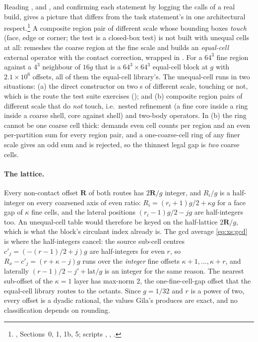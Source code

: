 Reading ,  and
, and confirming each statement by logging the calls of a
real  build, gives a picture that differs from the task statement's in
one architectural respect.\footnote{, Sections~0, 1, 1b, 5;
scripts , , .} A composite
region pair of different scale whose bounding boxes \emph{touch} (face, edge or corner; the
test is a closed-box test) is not built with unequal cells at all:  remeshes
the coarse region at the fine scale and builds an \emph{equal-cell} external operator with
the contact correction, wrapped in . For a $64^3$ fine region against a
$4^3$ neighbour of $16g$ that is a $64^3\times64^3$ equal-cell block at $g$ with
$2.1\times10^{6}$ offsets, all of them the equal-cell library's. The unequal-cell
 runs in two situations: (a) the direct constructor
 on two s of different scale, touching or not, which
is the route the test suite exercises (); and (b) composite region
pairs of different scale that do \emph{not} touch, i.e.\ nested refinement (a fine core
inside a ring inside a coarse shell, core against shell) and two-body operators. In (b) the
ring cannot be one coarse cell thick:  demands even cell counts per region
and  an even per-partition sum for every region pair, and a
one-coarse-cell ring of any finer scale gives an odd sum and is rejected, so the thinnest
legal gap is \emph{two} coarse cells.

\paragraph{The lattice.} Every non-contact offset $\mathbf{R}$ of both routes has
$2\mathbf{R}/g$ integer, and $R_i/g$ is a half-integer on every coarsened axis of even
ratio: $R_i = (r_i+1)g/2+\kappa g$ for a face gap of $\kappa$ fine cells, and the lateral
positions $(r_i-1)g/2 - jg$ are half-integers too. An unequal-cell table would therefore be
keyed on the half-lattice $2\mathbf{R}/g$, which is what the block's circulant index already
is. The gcd average \eqref{eq:xs:gcd} is where the half-integers cancel: the source
sub-cell centres $c'_j = (-(r-1)/2+j)g$ are half-integers for even $r$, so
$R_x - c'_j = (r+\kappa-j)g$ runs over the \emph{integer} fine offsets $\kappa+1,\dots,\kappa+r$,
and laterally $(r-1)/2-j'+\mathrm{lat}/g$ is an integer for the same reason. The nearest
sub-offset of the $\kappa = 1$ layer has max-norm $2$, the one-fine-cell-gap offset that the
equal-cell library routes to the octants. Since $g = 1/32$ and $r$ is a power of two, every
offset is a dyadic rational, the  values Gila's  produces are
exact, and no classification depends on rounding.

